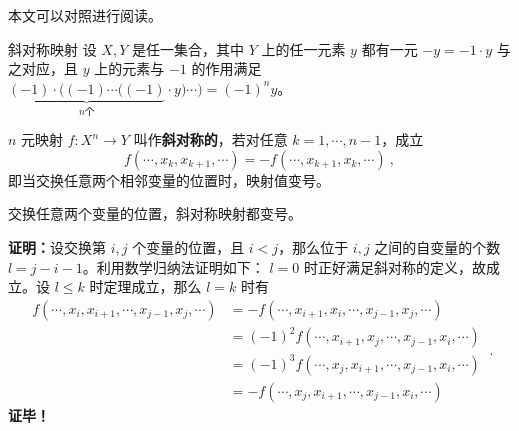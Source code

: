 

本文可以对照进行阅读。

\begin{definition}{斜对称映射}\label{def_AntMap_1}
设 $X,Y$ 是任一集合，其中 $Y$ 上的任一元素 $y$ 都有一元 $-y=-1\cdot y$ 与之对应，且 $y$ 上的元素与 $-1$ 的作用满足 $\underbrace{(-1)\cdot((-1)\cdots((-1)}_{n\text{个}}\cdot y)\cdots)=(-1)^n y$。

 $n$ 元映射 $f:X^n\rightarrow Y$ 叫作\textbf{斜对称的}，若对任意 $k=1,\cdots,n-1$，成立
\begin{equation}\label{eq_AntMap_3}
f(\cdots,x_k,x_{k+1},\cdots)=-f(\cdots,x_{k+1},x_k,\cdots)~,
\end{equation}
即当交换任意两个相邻变量的位置时，映射值变号。
\end{definition}
\begin{theorem}{}\label{the_AntMap_1}
交换任意两个变量的位置，斜对称映射都变号。
\end{theorem}
\textbf{证明：}设交换第 $i,j$ 个变量的位置，且 $i<j$，那么位于 $i,j$ 之间的自变量的个数 $l=j-i-1$。利用数学归纳法证明如下： $l=0$ 时正好满足斜对称的定义，故成立。设 $l\leq k$ 时定理成立，那么 $l=k$ 时有
\begin{equation}
\begin{aligned}
f(\cdots,x_i,x_{i+1},\cdots,x_{j-1},x_j,\cdots)&=-f(\cdots,x_{i+1},x_{i},\cdots,x_{j-1},x_j,\cdots)\\
&=(-1)^2 f(\cdots,x_{i+1},x_{j},\cdots,x_{j-1},x_i,\cdots)\\
&=(-1)^3 f(\cdots,x_{j},x_{i+1},\cdots,x_{j-1},x_i,\cdots)\\
&=-f(\cdots,x_{j},x_{i+1},\cdots,x_{j-1},x_i,\cdots)
\end{aligned}~.
\end{equation}
\textbf{证毕！}

